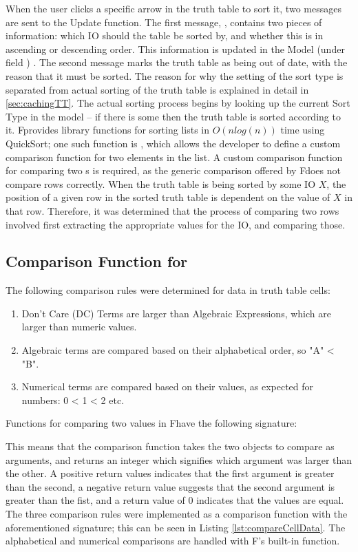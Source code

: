 When the user clicks a specific arrow in the truth table to sort it, two messages are sent to the Update function. The first message, , contains two pieces of information: which IO should the table be sorted by, and whether this is in ascending or descending order. This information is updated in the Model (under field ) . The second message marks the truth table as being out of date, with the reason that it must be sorted. The reason for why the setting of the sort type is separated from actual sorting of the truth table is explained in detail in \ref{sec:cachingTT}. The actual sorting process begins by looking up the current Sort Type in the model -- if there is some then the truth table is sorted according to it. 
F\fsharp provides library functions for sorting lists in $O(n log(n))$ time using QuickSort; one such function is , which allows the developer to define a custom comparison function for two elements in the list. A custom comparison function for comparing two s is required, as the generic comparison offered by F\fsharp does not compare rows correctly. When the truth table is being sorted by some IO $X$, the position of a given row in the sorted truth table is dependent on the value of $X$ in that row. Therefore, it was determined that the process of comparing two rows involved first extracting the appropriate  values for the IO, and comparing those.

\subsection{Comparison Function for }
The following comparison rules were determined for data in truth table cells:
\begin{enumerate}
    \item Don't Care (DC) Terms are larger than Algebraic Expressions, which are larger than numeric values.
    \item Algebraic terms are compared based on their alphabetical order, so "A" < "B".
    \item Numerical terms are compared based on their values, as expected for numbers: 0 < 1 < 2 etc.
\end{enumerate}

Functions for comparing two values in F\fsharp have the following signature:
\begin{center}
\end{center}
This means that the comparison function takes the two objects to compare as arguments, and returns an integer which signifies which argument was larger than the other. A positive return values indicates that the first argument is greater than the second, a negative return value suggests that the second argument is greater than the fist, and a return value of 0 indicates that the values are equal. The three comparison rules were implemented as a comparison function with the aforementioned signature; this can be seen in Listing \ref{lst:compareCellData}. The alphabetical and numerical comparisons are handled with F\fsharp's built-in  function.

